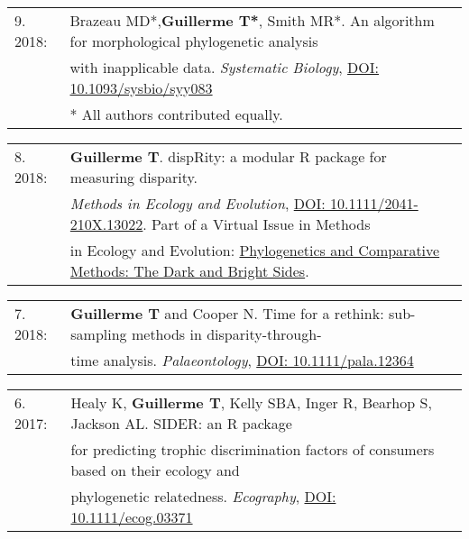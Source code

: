 \documentclass[10pt,a4paper]{article}
\begin{document}
{\begin{tabular}{ll}
9. 2018: & Brazeau MD*,\textbf{Guillerme T*}, Smith MR*. An algorithm for morphological phylogenetic analysis \\
      & with inapplicable data. \textit{Systematic Biology}, \href{https://doi.org/10.1093/sysbio/syy083}{DOI: 10.1093/sysbio/syy083}\\
      & \footnotesize{* All authors contributed equally.}
\end{tabular}

\bigskip

\begin{tabular}{ll}
8. 2018: & \textbf{Guillerme T}. dispRity: a modular R package for measuring disparity.\\
      & \textit{Methods in Ecology and Evolution}, \href{https://besjournals.onlinelibrary.wiley.com/doi/abs/10.1111/2041-210X.13022}{DOI: 10.1111/2041-210X.13022}. Part of a Virtual Issue in Methods\\
      & in Ecology and Evolution: \href{https://besjournals.onlinelibrary.wiley.com/doi/toc/10.1111/(ISSN)2041-210X.PhylogeneticsMEE2019}{Phylogenetics and Comparative Methods: The Dark and Bright Sides}.\\

\end{tabular}

\bigskip

\begin{tabular}{ll}
7. 2018: & \textbf{Guillerme T} and Cooper N. Time for a rethink: sub-sampling methods in disparity-through-\\
      & time analysis. \textit{Palaeontology}, \href{https://onlinelibrary.wiley.com/doi/abs/10.1111/pala.12364}{DOI: 10.1111/pala.12364}\\
\end{tabular}

\bigskip

\begin{tabular}{ll}
6. 2017: & Healy K, \textbf{Guillerme T}, Kelly SBA, Inger R, Bearhop S, Jackson AL. SIDER: an R package\\
      & for predicting trophic discrimination factors of consumers based on their ecology and\\
      & phylogenetic relatedness. \textit{Ecography}, \href{http://onlinelibrary.wiley.com/doi/10.1111/ecog.03371/full}{DOI: 10.1111/ecog.03371}\\
\end{tabular}

}
\end{document}
